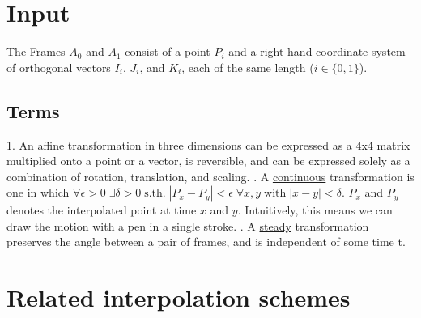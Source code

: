 \documentclass[journal, letterpaper]{IEEEtran}
\begin{document}
\section{Input}
The Frames $A_0$ and $A_1$ consist of a point $P_i$ and a right hand coordinate system of orthogonal vectors $I_i$, $J_i$, and $K_i$, each of the same length ($i \in \{0,1\}$).
\subsection{Terms} 
1. An \underline{affine} transformation in three dimensions can be expressed as a 4x4 matrix multiplied onto a point or a vector, is reversible, and can be expressed solely as a combination of rotation, translation, and scaling.
. A \underline{continuous} transformation is one in which $\forall \epsilon>0 \; \exists \delta>0 \; \text{s.th.} \; |P_x - P_y|<\epsilon \; \forall x,y \; \text{with} \; |x-y|<\delta$. $P_x$ and $P_y$ denotes the interpolated point at time $x$ and $y$. Intuitively, this means we can draw the motion with a pen in a single stroke.
. A \underline{steady} transformation preserves the angle between a pair of frames, and is independent of some time t. 

\section{Related interpolation schemes}
\end{document}

